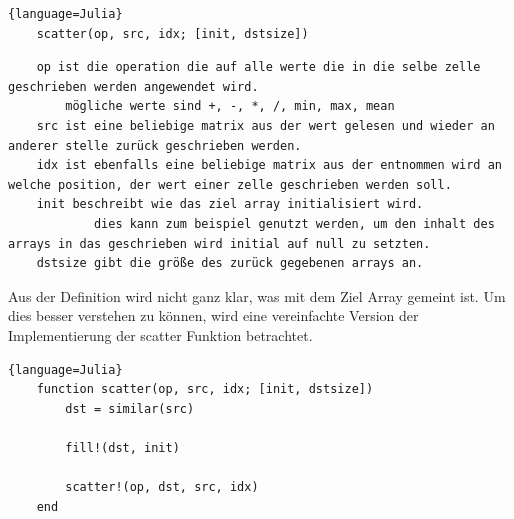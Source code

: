 \begin{lstlisting}{language=Julia}
	scatter(op, src, idx; [init, dstsize])
\end{lstlisting}

\begin{verbatim}
	op ist die operation die auf alle werte die in die selbe zelle geschrieben werden angewendet wird.
		mögliche werte sind +, -, *, /, min, max, mean
	src ist eine beliebige matrix aus der wert gelesen und wieder an anderer stelle zurück geschrieben werden.
	idx ist ebenfalls eine beliebige matrix aus der entnommen wird an welche position, der wert einer zelle geschrieben werden soll.
	init beschreibt wie das ziel array initialisiert wird.
			dies kann zum beispiel genutzt werden, um den inhalt des arrays in das geschrieben wird initial auf null zu setzten.
	dstsize gibt die größe des zurück gegebenen arrays an.
\end{verbatim}

Aus der Definition wird nicht ganz klar, was mit dem Ziel Array gemeint ist.
Um dies besser verstehen zu können, wird eine vereinfachte Version der Implementierung der scatter Funktion betrachtet.

\begin{lstlisting}{language=Julia}
	function scatter(op, src, idx; [init, dstsize])
		dst = similar(src)
		
		fill!(dst, init)
		
		scatter!(op, dst, src, idx)
	end
\end{lstlisting}

